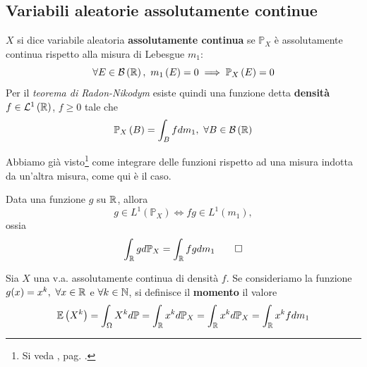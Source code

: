 \subsection{Variabili aleatorie assolutamente continue}
\begin{define}
	$X$ si dice variabile aleatoria \textbf{assolutamente continua} se $\mathbb{P}_X$ è assolutamente continua rispetto alla misura di Lebesgue $m_1$:
	\begin{equation}
		\forall E\in\mathcal{B}\left(\mathbb{R}\right),\ m_1\left(E\right)=0\implies \mathbb{P}_X\left(E\right)=0
	\end{equation}
	Per il \textit{teorema di Radon-Nikodym} esiste quindi una funzione detta \textbf{densità} $f\in\mathcal{L}^1\left(\mathbb{R}\right)$, $f\geq 0$ tale che
	\begin{equation}
		\mathbb{P}_X\left(B\right)=\int_B fdm_1,\ \forall B\in\mathcal{B}\left(\mathbb{R}\right)
	\end{equation}
\end{define}
Abbiamo già visto\footnote{Si veda , pag. \pageref{misuraindotta}.} come integrare delle funzioni rispetto ad una misura indotta da un'altra misura, come qui è il caso.
\begin{theoremaqed}
	Data una funzione $g$ su $\mathbb{R}$, allora
	\begin{equation}
		g\in L^{1}\left(\mathbb{P}_X\right)\iff fg\in L^{1}\left(m_1\right),
	\end{equation}
	ossia
	\begin{equation}
		\int_{\mathbb{R}}gd\mathbb{P}_X=\int_{\mathbb{R}}fgdm_1\qedhere
	\end{equation}
\end{theoremaqed}
\begin{define}
	Sia $X$ una v.a. assolutamente continua di densità $f$. Se consideriamo la funzione $g(x)=x^k,\ \forall x\in\realset$ e $\forall k\in\mathbb{N}$, si definisce il \textbf{momento} il valore
	\begin{equation*}
		\mathbb{E}\left(X^k\right)=\int_{\Omega}X^kd\mathbb{P}=\int_{\mathbb{R}}x^kd\mathbb{P}_X=\int_{\mathbb{R}}x^kd\mathbb{P}_X=\int_{\mathbb{R}}x^kfdm_1
	\end{equation*}
\end{define}

